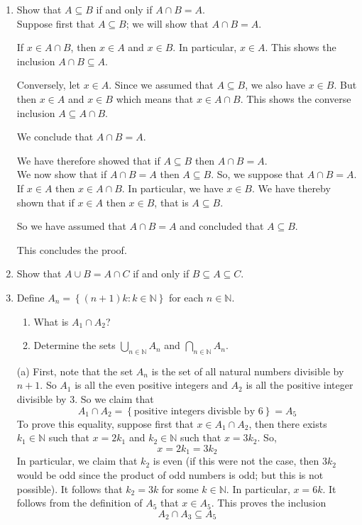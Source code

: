 \documentclass[12pt, reqno]{article}
\numberwithin{equation}{section}
\theoremstyle{definition}
\theoremstyle{remark}
\newcommand{\NN}{\mathbb{N}}
\newcommand{\set}[1]{\left\{#1\right\}}
\begin{document}
\begin{enumerate}[leftmargin=*]
	\item Show that $A\subseteq B$ if and only if $A\cap B = A$. \\

	      Suppose first that $A\subseteq B$; we will show that $A\cap B = A$.

	      If $x\in A\cap B$, then $x\in A$ and $x\in B$. In particular, $x\in A$. This shows the inclusion $A\cap B\subseteq A$.

	      Conversely, let $x\in A$. Since we assumed that $A\subseteq B$, we also have $x\in B$. But then $x\in A$ and $x\in B$ which means that $x\in A\cap B$. This shows the converse inclusion $A\subseteq A\cap B$.

	      We conclude that $A\cap B = A$.

	      We have therefore showed that if $A\subseteq B$ then $A\cap B = A$.\\

	      We now show that if $A\cap B = A$ then $A\subseteq B$. So, we suppose that $A\cap B = A$. If $x\in A$ then $x\in A\cap B$. In particular, we have $x\in B$. We have thereby shown that if $x\in A$ then $x\in B$, that is $A\subseteq B$.

	      So we have assumed that $A\cap B = A$ and concluded that $A\subseteq B$.

	      This concludes the proof.

	\item Show that $A\cup B = A\cap C$ if and only if $B\subseteq A\subseteq C$.

	\item Define $A_n = \set{(n+1)k : k\in \NN}$ for each $n\in \NN$.
	      \begin{enumerate}
		      \item What is $A_1\cap A_2$?
		      \item Determine the sets $\bigcup_{n\in \NN}A_n$ and $\bigcap_{n\in \NN} A_n$.
	      \end{enumerate}

	      (a) First, note that the set $A_n$ is the set of all natural numbers divisible by $n+1$. So $A_1$ is all the even positive integers and $A_2$ is all the positive integer divisible by 3. So we claim that
	      \[
		      A_1\cap A_2 = \set{\text{positive integers divisble by 6}} = A_5
	      \]
	      To prove this equality, suppose first that $x\in A_1\cap A_2$, then there exists $k_1 \in \NN$ such that $x = 2k_1$ and $k_2\in \NN$ such that $x = 3k_2$. So,
	      \[
		      x=  2k_1 = 3k_2
	      \]
	      In particular, we claim that $k_2$ is even (if this were not the case, then $3k_2$ would be odd since the product of odd numbers is odd; but this is not possible). It follows that $k_2 = 3k$ for some $k\in \NN$. In particular, $x = 6k$. It follows from the definition of $A_5$ that $x\in A_5$. This proves the inclusion
	      \[
		      A_2\cap A_3\subseteq A_5
	      \]


\end{enumerate}
\end{document}
